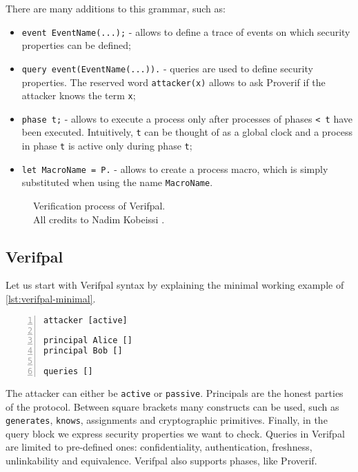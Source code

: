 \lstset{language=proverif}
There are many additions to this grammar, such as:
\begin{itemize}
    \item{\lstinline{event EventName(...);} - allows to define a trace of events on which security properties can be defined;}
    \item{\lstinline{query event(EventName(...)).} - queries are used to define security properties. The reserved word \lstinline{attacker(x)} allows to ask Proverif if the attacker knows the term \lstinline{x};}
    \item{\lstinline{phase t;} - allows to execute a process only after processes of phases \lstinline{< t} have been executed. Intuitively, \lstinline{t} can be thought of as a global clock and a process in phase \lstinline{t}  is active only during phase \lstinline{t};}
    \item{\lstinline{let MacroName = P.} - allows to create a process macro, which is simply substituted when using the name \lstinline{MacroName}.}
\end{itemize}


\begin{figure}[t]
    \centering
    \caption{Verification process of Verifpal.\\ All credits to Nadim Kobeissi \cite{VerifpalManual}.}
    \label{fig:verifpal-verification}
\end{figure}

\newpage
\subsection{Verifpal}


Let us start with Verifpal syntax by explaining the minimal working example of \cref{lst:verifpal-minimal}.

\lstset{language=verifpal}
\begin{lstlisting}[numbers=left,caption={Verifpal's minimal working example}, label={lst:verifpal-minimal}]
attacker [active]

principal Alice []
principal Bob []

queries []
\end{lstlisting}

The attacker can either be \lstinline{active} or \lstinline{passive}.
Principals are the honest parties of the protocol. Between square brackets many constructs can be used, such as \lstinline{generates}, \lstinline{knows}, assignments and cryptographic primitives.
Finally, in the query block we express security properties we want to check. Queries in Verifpal are limited to pre-defined ones: confidentiality, authentication, freshness, unlinkability and equivalence.
Verifpal also supports phases, like Proverif.


